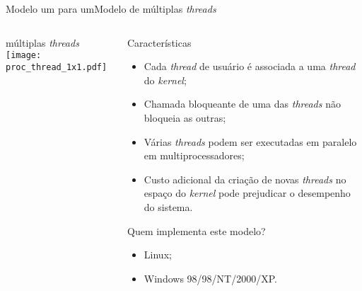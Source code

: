 \begin{frame}{Modelo um para um}{Modelo de múltiplas {\em threads}}
  \begin{columns}
    \begin{column}{0.375\textwidth}
      \begin{block}{múltiplas \em threads}
        \texttt{[image: proc\_thread\_1x1.pdf]}
      \end{block}
    \end{column}
    \small
    \begin{column}{0.6\textwidth}
      \begin{block}{Características}
        \begin{itemize}
        \item Cada {\em thread} de usuário é associada a uma {\em
            thread} do {\em kernel};
        \item Chamada bloqueante de uma das {\em threads} \alert{não} bloqueia as outras;
        \item Várias {\em threads} podem ser executadas em paralelo em
          multiprocessadores;
        \item Custo adicional da criação de novas {\em threads} no
          espaço do {\em kernel} pode prejudicar o desempenho do sistema.
        \end{itemize}
      \end{block}
      \begin{block}{Quem implementa este modelo?}
        \begin{itemize}
        \item Linux;
        \item Windows 98/98/NT/2000/XP.
        \end{itemize}
      \end{block}
    \end{column}
  \end{columns}
\end{frame}


